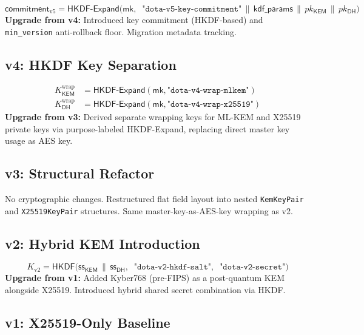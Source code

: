 \documentclass[11pt,a4paper]{article}
\newcommand{\KEM}{\mathsf{KEM}}
\renewcommand{\DH}{\mathsf{DH}}
\newcommand{\HKDF}{\mathsf{HKDF}}
\newcommand{\mk}{\mathsf{mk}}
\newcommand{\bytes}[1]{\texttt{#1}}
\begin{document}
\begin{equation}
\mathsf{commitment}_{\mathrm{v5}} = \HKDF\text{-}\mathsf{Expand}\bigl(\mk,\;\;
\bytes{"dota-v5-key-commitment"} \,\|\, \mathsf{kdf\_params} \,\|\, pk_{\KEM} \,\|\, pk_{\DH}\bigr)
\end{equation}
\textbf{Upgrade from v4:} Introduced key commitment (HKDF-based) and
\texttt{min\_version} anti-rollback floor. Migration metadata tracking.

\subsection{v4: HKDF Key Separation}

\begin{align}
K_{\KEM}^{\mathrm{wrap}} &= \HKDF\text{-}\mathsf{Expand}(\mk, \bytes{"dota-v4-wrap-mlkem"}) \\
K_{\DH}^{\mathrm{wrap}} &= \HKDF\text{-}\mathsf{Expand}(\mk, \bytes{"dota-v4-wrap-x25519"})
\end{align}
\textbf{Upgrade from v3:} Derived separate wrapping keys for ML-KEM and
X25519 private keys via purpose-labeled HKDF-Expand, replacing direct
master key usage as AES key.

\subsection{v3: Structural Refactor}

No cryptographic changes. Restructured flat field layout into nested
\texttt{KemKeyPair} and \texttt{X25519KeyPair} structures. Same
master-key-as-AES-key wrapping as v2.

\subsection{v2: Hybrid KEM Introduction}

\begin{equation}
K_{\mathrm{v2}} = \HKDF\bigl(\mathsf{ss}_{\KEM} \,\|\, \mathsf{ss}_{\DH},\;\;
\bytes{"dota-v2-hkdf-salt"},\;\;\bytes{"dota-v2-secret"}\bigr)
\end{equation}
\textbf{Upgrade from v1:} Added Kyber768 (pre-FIPS) as a post-quantum
KEM alongside X25519. Introduced hybrid shared secret combination via HKDF.

\subsection{v1: X25519-Only Baseline}
\end{document}
